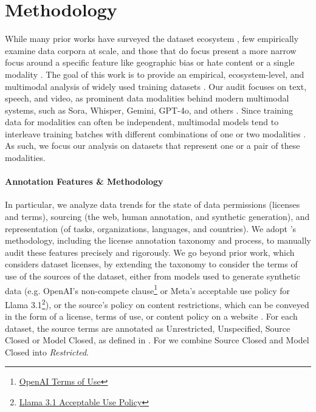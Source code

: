 \vspace{-2mm}
\section{Methodology}
\label{sec:methodology}



\vspace{-2mm}
While many prior works have surveyed the dataset ecosystem \citep{albalak2024survey, liu2024datasets, malik2021automatic, prabhavalkar2023end, 8627985}, few empirically examine data corpora at scale, and those that do focus present a more narrow focus around a specific feature like geographic bias or hate content\citep{birhane2023into,mcmillan2022documenting,shankar2017no} or a single modality \citep{dodge2021documenting, caswell2021quality, elazars, longpre2023data}. The goal of this work is to provide an empirical, ecosystem-level, and multimodal analysis of widely used training datasets \citep{Cen2023}. Our audit focuses on text, speech, and video, as prominent data modalities behind modern multimodal systems, such as Sora, Whisper, Gemini, GPT-4o, and others \citep{sora2024, opensora, radford2023robust, peng2023reproducing, team2023gemini, openAIGPT4o2024}.
Since training data for modalities can often be independent, multimodal models tend to interleave training batches with different combinations of one or two modalities \citep{aghajanyan2023scaling}.
As such, we focus our analysis on datasets that represent one or a pair of these modalities.

\vspace{-2mm}
\paragraph{Annotation Features \& Methodology}
In particular, we analyze data trends for the state of data permissions (licenses and terms), sourcing (the web, human annotation, and synthetic generation), and representation (of tasks, organizations, languages, and countries).
We adopt \citet{longpre2023data}'s methodology, including the license annotation taxonomy and process, to manually audit these features precisely and rigorously.
We go beyond prior work, which considers dataset licenses, by extending the taxonomy to consider the terms of use of the sources of the dataset, either from models used to generate synthetic data (e.g. OpenAI's non-compete clause\footnote{\href{https://openai.com/policies/row-terms-of-use/}{OpenAI Terms of Use}} or Meta's acceptable use policy for Llama 3.1\footnote{\href{https://www.llama.com/llama3_1/use-policy/}{Llama 3.1 Acceptable Use Policy}}), or the source's policy on content restrictions, which can be conveyed in the form of a license, terms of use, or content policy on a website \citep{klyman2024acceptableusepoliciesfoundation}.
For each dataset, the source terms are annotated as Unrestricted, Unspecified, Source Closed or Model Closed, as defined in .
For  we combine Source Closed and Model Closed into \emph{Restricted}.

